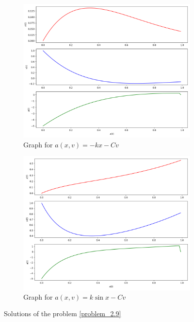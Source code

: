     \begin{figure}[h!]
        \centering
        \begin{subfigure}[b]{\linewidth}
            \includegraphics[width=0.9\linewidth]{img/chapter2/2-9/2_9_accele_a.png}
            \caption{Graph for $a(x,v) = -kx-Cv$}
        \end{subfigure}
        \begin{subfigure}[b]{\linewidth}
            \includegraphics[width=0.9\linewidth]{img/chapter2/2-9/2_9_accele_b.png}
            \caption{Graph for $a(x,v) = k\sin{x}-Cv$}
        \end{subfigure}
        \caption{Solutions of the problem \ref{problem_2.9}}
        \label{fig:problem 2-9}
    \end{figure}